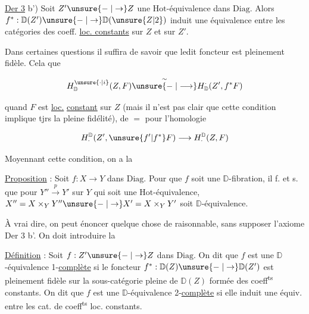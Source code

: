 \uline{Der 3} b') Soit $Z'\unsure{\relbar|\to}Z$ une $\mathrm{Hot}$-équivalence dans $\mathrm{Diag}$. Alors $f^*:\mathbb D(Z')\unsure{\relbar|\to}\mathbb D(\unsure{Z|2})$ induit une équivalence entre les catégories des coeff. \uline{loc. constants} sur $Z$ et sur $Z'$.


Dans certaines questions il suffira de savoir que ledit foncteur est pleinement fidèle. Cela   que

\[
H^{\unsure{\cdot|i}}_{\mathbb D}(Z,F)\overset{\sim}{\unsure{\relbar|\longrightarrow}}H^{\cdot}_{\mathbb D}(Z',f^*F)
\]

quand $F$ est \uline{loc.} \uline{constant} sur $Z$   (mais il n'est pas clair que cette condition implique tjrs la pleine fidélité), de $=$ pour l'homologie

\[
H^{\mathbb D}_{\cdot}(Z',\unsure{f'|f^*}F)\longrightarrow H^{\mathbb D}_{\cdot}(Z,F)
\]




Moyennant cette condition, on a la

\uline{Proposition} :  Soit $f:X\to Y$ dans $\mathrm{Diag}$. Pour que $f$ soit une $\mathbb D$-fibration, il f. et s. que pour $Y''\xrightarrow{p}Y'$ sur $Y$ qui soit une $\mathrm{Hot}$-équivalence, $X''=X\times_Y Y''\unsure{\relbar|\to} X'=X\times_Y Y'$ soit  $\mathbb D$-équivalence.

À vrai dire, on peut énoncer quelque chose de raisonnable, sans supposer l'axiome Der 3 b'. On doit introduire la

\uline{Définition} : Soit $f:Z'\unsure{\relbar|\to}Z$ dans $\mathrm{Diag}$. On dit que $f$ est une $\mathbb D$-équivalence 1-\uline{complète} si le foncteur $f^*:\mathbb D(Z)\unsure{\relbar|\to}\mathbb D(Z')$ est pleinement fidèle sur la sous-catégorie pleine de $\mathbb D(Z)$ formée des coeff\textsuperscript{ts}  constants. On dit que $f$ est une $\mathbb D$-équivalence 2-\uline{complète} si elle induit une équiv. entre les cat. de coeff\textsuperscript{ts} loc. constants.

